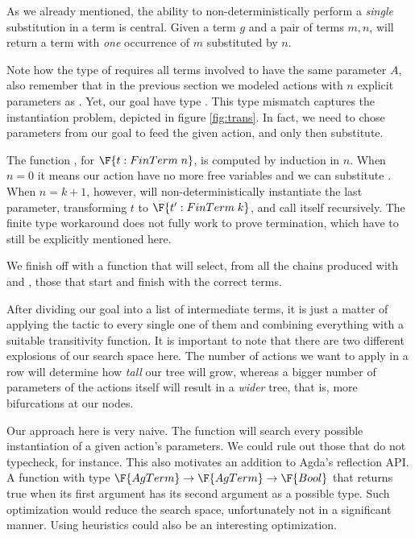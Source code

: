 As we already mentioned, the ability to non-deterministically perform a \emph{single} substitution
in a term is central. Given a term $g$ and a pair of terms $m , n$,  will return
a term with \emph{one} occurrence of $m$ substituted by $n$. 


Note how the type of \F{$\_[\_] $} requires all terms involved to have the same parameter $A$,
also remember that in the previous section we modeled actions with $n$ explicit parameters as .
Yet, our goal have type . This type mismatch captures the instantiation problem,
depicted in figure \ref{fig:trans}. In fact, we need to chose parameters from our goal to feed
the given action, and only then substitute. 


The function , for $\F{t : FinTerm\; n}$, is computed by induction in $n$.
When $n = 0$ it means our action have no more free variables and we can substitute . 
When $n = k + 1$, however,  will non-deterministically
instantiate the last parameter, transforming $t$ to $\F{t' : FinTerm\; k}$, and call itself recursively.
The finite type workaround does not fully work to prove termination, which have to still be explicitly mentioned here.

We finish off with a function that will select, from all the chains produced with \F{$\_[\_]$} and ,
those that start and finish with the correct terms.


After dividing our goal into a list of intermediate terms, it is just a matter of applying the
tactic to every single one of them and combining everything with a suitable transitivity function.
It is important to note that there are two different explosions of our search space here. The
number of actions we want to apply in a row will determine how \emph{tall} our tree will grow,
whereas a bigger number of parameters of the actions itself will result in a \emph{wider} tree, that is,
more bifurcations at our nodes.

Our approach here is very naive. The  function will search every possible instantiation
of a given action's parameters. We could rule out those that do not typecheck, for instance.
This also motivates an addition to Agda's reflection API. A function with type $\F{AgTerm} \rightarrow \F{AgTerm} \rightarrow \F{Bool}$ that returns true when its first argument has its second argument as a possible type.
Such optimization would reduce the search space, unfortunately not in a significant manner.
Using heuristics could also be an interesting optimization.

